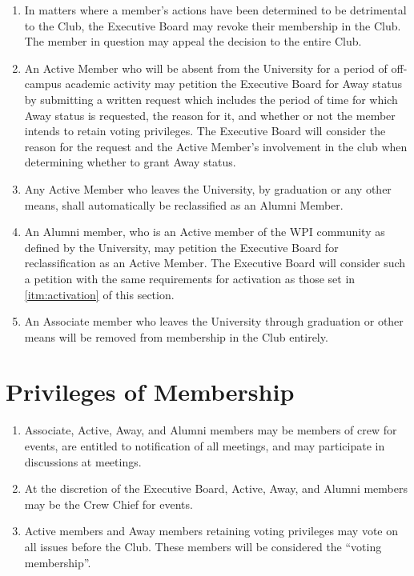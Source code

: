 \documentclass[12pt,letterpaper,oneside]{book}
\begin{document}
\begin{enumerate}
\item \label{itm:expulsion} In matters where a member's actions have been determined to be detrimental to the Club, the Executive Board may revoke their membership in the Club.  The member in question may appeal the decision to the entire Club.
\item \label{itm:awaystatus} An Active Member who will be absent from the University for a period of off-campus academic activity may petition the Executive Board for Away status by submitting a written request which includes the period of time for which Away status is requested, the reason for it, and whether or not the member intends to retain voting privileges. The Executive Board will consider the reason for the request and the Active Member’s involvement in the club when determining whether to grant Away status.
\item \label{itm:alumnistatus} Any Active Member who leaves the University, by graduation or any other means, shall automatically be reclassified as an Alumni Member.
\item \label{itm:reactivation} An Alumni member, who is an Active member of the WPI community as defined by the University, may petition the Executive Board for reclassification as an Active Member. The Executive Board will consider such a petition with the same requirements for activation as those set in \cref{itm:activation} of this section.
\item \label{itm:associategraduation} An Associate member who leaves the University through graduation or other means will be removed from membership in the Club entirely.

\end{enumerate}

\section{Privileges of Membership}

\begin{enumerate}

\item Associate, Active, Away, and Alumni members may be members of crew for events, are entitled to notification of all meetings, and may participate in discussions at meetings.
\item At the discretion of the Executive Board, Active, Away, and Alumni members may be the Crew Chief for events.
\item Active members and Away members retaining voting privileges may vote on all issues before the Club. These members will be considered the “voting membership”.

\end{enumerate}
\end{document}
